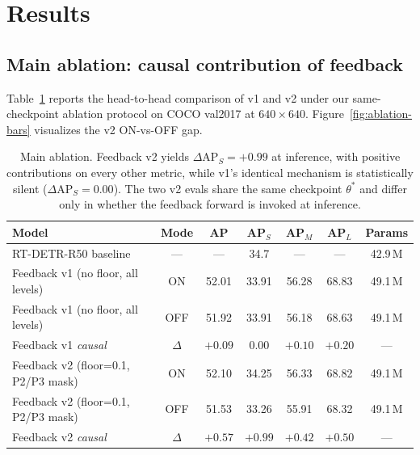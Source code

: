 \section{Results}
\label{sec:results}

\subsection{Main ablation: causal contribution of feedback}
\label{sec:results-main}

Table~\ref{tab:main} reports the head-to-head comparison of v1 and v2 under our same-checkpoint ablation protocol on COCO val2017 at $640\!\times\!640$. Figure~\ref{fig:ablation-bars} visualizes the v2 ON-vs-OFF gap.

\begin{table}[H]
\centering
\small
\setlength{\tabcolsep}{6pt}
\begin{tabular}{lcccccc}
    \toprule
    \textbf{Model} & \textbf{Mode} & $\mathbf{AP}$ & $\mathbf{AP}_S$ & $\mathbf{AP}_M$ & $\mathbf{AP}_L$ & \textbf{Params} \\
    \midrule
    RT-DETR-R50 baseline~\cite{lyu2024rtdetr} & --- & --- & 34.7 & --- & --- & 42.9\,M \\
    \midrule
    Feedback v1 (no floor, all levels) & ON  & 52.01 & 33.91 & 56.28 & 68.83 & 49.1\,M \\
    Feedback v1 (no floor, all levels) & OFF & 51.92 & 33.91 & 56.18 & 68.63 & 49.1\,M \\
    \rowcolor{black!8} Feedback v1 \emph{causal} & $\Delta$ & $+0.09$ & $\boldsymbol{0.00}$ & $+0.10$ & $+0.20$ & --- \\
    \midrule
    Feedback v2 (floor=0.1, P2/P3 mask) & ON  & 52.10 & 34.25 & 56.33 & 68.82 & 49.1\,M \\
    Feedback v2 (floor=0.1, P2/P3 mask) & OFF & 51.53 & 33.26 & 55.91 & 68.32 & 49.1\,M \\
    \rowcolor{black!8} Feedback v2 \emph{causal} & $\Delta$ & $+0.57$ & $\boldsymbol{+0.99}$ & $+0.42$ & $+0.50$ & --- \\
    \bottomrule
\end{tabular}
\caption{Main ablation. Feedback v2 yields $\Delta\mathrm{AP}_S = +0.99$ at inference, with positive contributions on every other metric, while v1's identical mechanism is statistically silent ($\Delta\mathrm{AP}_S = 0.00$). The two v2 evals share the same checkpoint $\theta^*$ and differ only in whether the feedback forward is invoked at inference.}
\label{tab:main}
\end{table}

